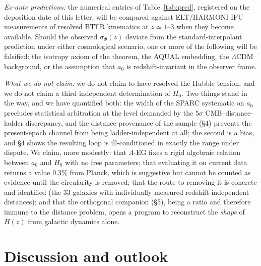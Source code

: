 \documentclass[11pt,a4paper]{article}
\begin{document}
\emph{Ex-ante predictions:} the numerical entries of Table~\ref{tab:pred},
registered on the deposition date of this letter, will be compared against
ELT/HARMONI IFU measurements of resolved BTFR kinematics at
$z \simeq 1$--$3$ when they become available. Should the observed
$\sigma_\Phi(z)$ deviate from the standard-interpolant prediction under
either cosmological scenario, one or more of the following will be
falsified: the isotropy axiom of the theorem, the AQUAL embedding, the
$\Lambda$CDM background, or the assumption that $a_0$ is redshift-invariant
in the observer frame.

\emph{What we do not claim:} we do not claim to have resolved the Hubble
tension, and we do not claim a third independent determination of $H_0$.
Two things stand in the way, and we have quantified both: the width of the
SPARC systematic on $a_0$ precludes statistical arbitration at the level
demanded by the $5\sigma$ CMB--distance-ladder discrepancy, and the
distance provenance of the sample (\S4) prevents the present-epoch channel
from being ladder-independent at all; the second is a bias, and \S4 shows
the resulting loop is ill-conditioned in exactly the range under dispute.
We claim, more modestly: that
$\Lambda$-EG fixes a rigid algebraic relation between $a_0$ and $H_0$ with
no free parameters; that evaluating it on current data returns a value
$0.3\%$ from Planck, which is suggestive but cannot be counted as evidence
until the circularity is removed; that the route to removing it is concrete
and identified (the $33$ galaxies with individually measured
redshift-independent distances); and that the
orthogonal companion (\S5), being a ratio and therefore immune to the
distance problem, opens a program to reconstruct the \emph{shape} of $H(z)$
from galactic dynamics alone.

\section{Discussion and outlook}
\end{document}
